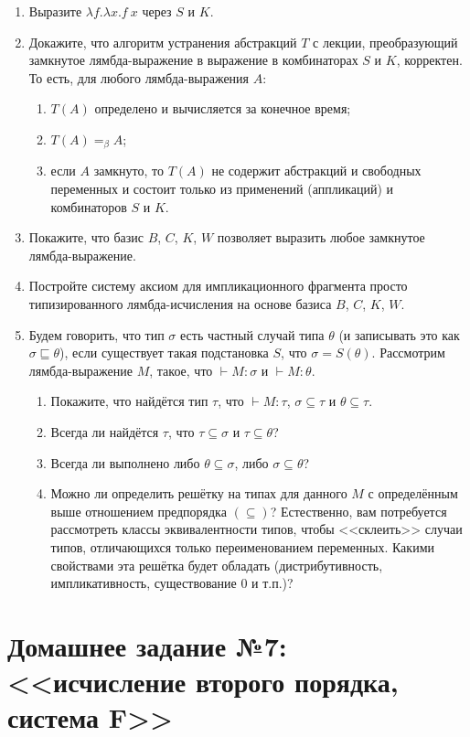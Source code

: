 \documentclass[10pt,a4paper,oneside]{article}
\begin{document}
\begin{enumerate}
\item Выразите $\lambda f.\lambda x.f\ x$ через $S$ и $K$.
\item Докажите, что алгоритм устранения абстракций $T$ с лекции, преобразующий замкнутое лямбда-выражение в 
выражение в комбинаторах $S$ и $K$, корректен. То есть, для любого лямбда-выражения $A$: 
\begin{enumerate}
\item $T(A)$ определено и вычисляется за конечное время;
\item $T(A) =_\beta A$;
\item если $A$ замкнуто, то $T(A)$ не содержит абстракций и свободных переменных и состоит только из
применений (аппликаций) и комбинаторов $S$ и $K$.
\end{enumerate}
\item Покажите, что базис $B$, $C$, $K$, $W$ позволяет выразить любое замкнутое лямбда-выражение.
\item Постройте систему аксиом для импликационного фрагмента просто типизированного лямбда-исчисления на основе
базиса $B$, $C$, $K$, $W$.
\item Будем говорить, что тип $\sigma$ есть частный случай типа $\theta$ (и записывать это как
$\sigma \sqsubseteq \theta$), если существует такая подстановка $S$, что $\sigma = S(\theta)$.
Рассмотрим лямбда-выражение $M$, такое, что $\vdash M: \sigma$ и $\vdash M: \theta$.
\begin{enumerate}
\item Покажите, что найдётся тип $\tau$, что $\vdash M:\tau$, $\sigma\subseteq\tau$ и $\theta\subseteq\tau$.
\item Всегда ли найдётся $\tau$, что $\tau \subseteq \sigma$ и $\tau \subseteq \theta$?
\item Всегда ли выполнено либо $\theta \subseteq \sigma$, либо $\sigma \subseteq \theta$?
\item Можно ли определить решётку на типах для данного $M$ с определённым выше отношением предпорядка $(\subseteq)$?
Естественно, вам потребуется рассмотреть классы эквивалентности типов, чтобы <<склеить>> случаи 
типов, отличающихся только переименованием переменных.
Какими свойствами эта решётка будет обладать (дистрибутивность, импликативность, существование 0 и т.п.)?
\end{enumerate}
\end{enumerate}

\section*{Домашнее задание №7: <<исчисление второго порядка, система F>>}
\end{document}
